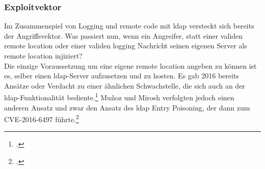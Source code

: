\subsubsection{Exploitvektor}
Im Zusammenspiel von Logging und remote code mit \gls{ldap} versteckt sich bereits der Angriffsvektor. Was passiert nun, wenn ein Angreifer, statt einer validen remote location oder einer
validen logging Nachricht seinen eigenen Server als remote location injiziert?\\
Die einzige Voraussetzung um eine eigene remote location angeben zu können ist es, selber einen \gls{ldap}-Server aufzusetzen und zu hosten. Es gab 2016 bereits Ansätze
oder Verdacht zu einer ähnlichen Schwachstelle, die sich auch an der \gls{ldap}-Funktionalität bediente.\footcite{blackhatPresentation} Muñoz und Mirosh verfolgten jedoch einen anderen Ansatz und zwar den Ansatz des \gls{ldap} Entry Poisoning,
der dann zum CVE-2016-6497 führte.\footcite{cve2016}
